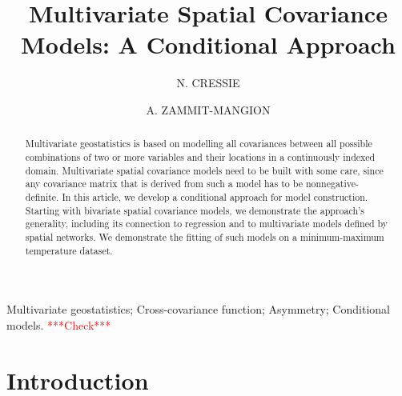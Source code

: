 \documentclass[lineno]{biometrika}
\newcommand{\red}{\textcolor{red}}%
\begin{document}



\title{Multivariate Spatial Covariance Models: A Conditional Approach}


\author{N. CRESSIE \and A. ZAMMIT-MANGION}

\maketitle

\begin{abstract}
Multivariate geostatistics is based on modelling all covariances between all possible combinations of two or more variables and their locations in a continuously indexed domain. Multivariate spatial covariance models need to be built with some care, since any covariance matrix that is derived from such a model has to be nonnegative-definite. In this article, we develop a conditional approach for model construction. Starting with bivariate spatial covariance models, we demonstrate the approach's generality, including its connection to regression and to multivariate models defined by spatial networks. We demonstrate the fitting of such models on a minimum-maximum temperature dataset.
\end{abstract}

\begin{keywords}
Multivariate geostatistics; Cross-covariance function; Asymmetry; Conditional models. \red{***Check***}
\end{keywords}


\section{Introduction}\label{sec:Intro}
\end{document}
